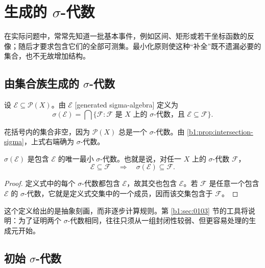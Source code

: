 \section{生成的 \texorpdfstring{\(\sigma\)}{σ}-代数}
\label{b1:sec:0102}

在实际问题中，常常先知道一批基本事件，例如区间、矩形或若干坐标函数的反像；随后才要求包含它们的全部可测集。最小化原则使这种“补全”既不遗漏必要的集合，也不无故增加结构。

\subsection{由集合族生成的 \texorpdfstring{\(\sigma\)}{σ}-代数}
\label{b1:subsec:010201}

\begin{definition}
\label{b1:def:generated-sigma}
设 \(\mathcal E\subseteq\mathcal P(X)\)。由 \(\mathcal E\) [generated sigma-algebra] 定义为
\[
\sigma(\mathcal E)
=\bigcap\{\mathcal F:\mathcal F\text{ 是 }X\text{ 上的 \(\sigma\)-代数，且 }\mathcal E\subseteq\mathcal F\}.
\]
\end{definition}

花括号内的集合非空，因为 \(\mathcal P(X)\) 总是一个 \(\sigma\)-代数。由 \cref{b1:prop:intersection-sigma}，上式右端确为 \(\sigma\)-代数。

\begin{proposition}
\label{b1:prop:generated-minimal}
\(\sigma(\mathcal E)\) 是包含 \(\mathcal E\) 的唯一最小 \(\sigma\)-代数。也就是说，对任一 \(X\) 上的 \(\sigma\)-代数 \(\mathcal F\)，
\[
\mathcal E\subseteq\mathcal F
\quad\Longrightarrow\quad
\sigma(\mathcal E)\subseteq\mathcal F.
\]
\end{proposition}
\begin{proof}
定义式中的每个 \(\sigma\)-代数都包含 \(\mathcal E\)，故其交也包含 \(\mathcal E\)。若 \(\mathcal F\) 是任意一个包含 \(\mathcal E\) 的 \(\sigma\)-代数，它就是定义式交集中的一个成员，因而该交集包含于 \(\mathcal F\)。
\end{proof}

这个定义给出的是抽象刻画，而非逐步计算规则。第 \ref{b1:sec:0103} 节的工具将说明：为了证明两个 \(\sigma\)-代数相同，往往只须从一组封闭性较弱、但更容易处理的生成元开始。

\subsection{初始 \texorpdfstring{\(\sigma\)}{σ}-代数}
\label{b1:subsec:010202}

